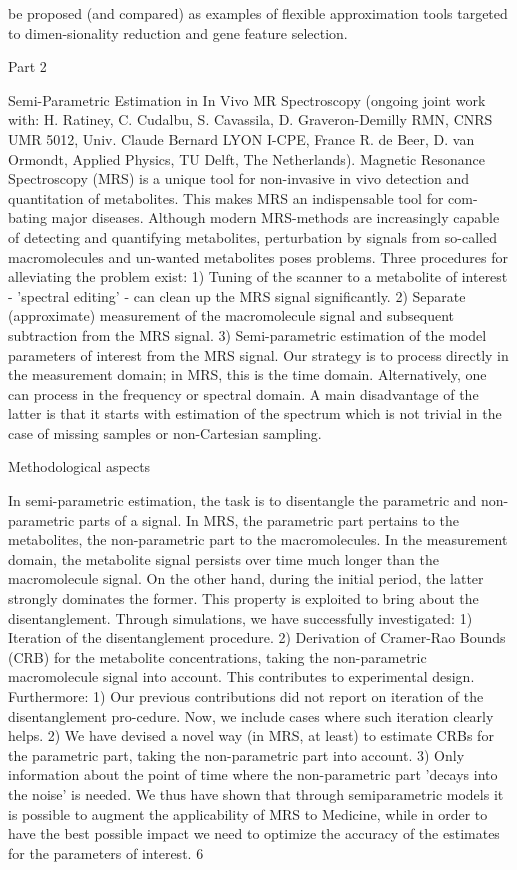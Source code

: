 \documentclass[11pt]{article}
\begin{document}
be proposed (and compared) as examples of flexible approximation tools targeted to dimen-sionality reduction and gene feature selection.

Part 2

Semi-Parametric Estimation in In Vivo MR Spectroscopy (ongoing joint work with: H. Ratiney, C. Cudalbu, S. Cavassila, D. Graveron-Demilly RMN, CNRS UMR 5012, Univ. Claude Bernard LYON I-CPE, France R. de Beer, D. van Ormondt, Applied Physics, TU Delft, The Netherlands). Magnetic Resonance Spectroscopy (MRS) is a unique tool for non-invasive in vivo detection and quantitation of metabolites. This makes MRS an indispensable tool for com-bating major diseases. Although modern MRS-methods are increasingly capable of detecting and quantifying metabolites, perturbation by signals from so-called macromolecules and un-wanted metabolites poses problems. Three procedures for alleviating the problem exist: 1) Tuning of the scanner to a metabolite of interest - 'spectral editing' - can clean up the MRS signal significantly. 2) Separate (approximate) measurement of the macromolecule signal and subsequent subtraction from the MRS signal. 3) Semi-parametric estimation of the model parameters of interest from the MRS signal. Our strategy is to process directly in the measurement domain; in MRS, this is the time domain. Alternatively, one can process in the frequency or spectral domain. A main disadvantage of the latter is that it starts with estimation of the spectrum which is not trivial in the case of missing samples or non-Cartesian sampling.

Methodological aspects

In semi-parametric estimation, the task is to disentangle the parametric and non-parametric parts of a signal. In MRS, the parametric part pertains to the metabolites, the non-parametric part to the macromolecules. In the measurement domain, the metabolite signal persists over time much longer than the macromolecule signal. On the other hand, during the initial period, the latter strongly dominates the former. This property is exploited to bring about the disentanglement. Through simulations, we have successfully investigated: 1) Iteration of the disentanglement procedure. 2) Derivation of Cramer-Rao Bounds (CRB) for the metabolite concentrations, taking the non-parametric macromolecule signal into account. This contributes to experimental design. Furthermore: 1) Our previous contributions did not report on iteration of the disentanglement pro-cedure. Now, we include cases where such iteration clearly helps. 2) We have devised a novel way (in MRS, at least) to estimate CRBs for the parametric part, taking the non-parametric part into account. 3) Only information about the point of time where the non-parametric part 'decays into the noise' is needed. We thus have shown that through semiparametric models it is possible to augment the applicability of MRS to Medicine, while in order to have the best possible impact we need to optimize the accuracy of the estimates for the parameters of interest. 6
\end{document}
